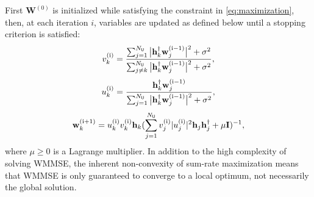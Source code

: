 First $\mathbf{W}^{(0)}$ is initialized while satisfying the constraint in \eqref{eq:maximization},
then, at each iteration $i$, variables are updated as defined below until a stopping criterion is satisfied:
\begin{align}
    v^{(\text{i})}_{k} = \frac{ \sum_{j =1}^{N_{\sf{U}}} \big|\mathbf{h}^{\dagger}_{k} \mathbf{w}^{(\text{i}-1)}_{j} \big|^2 + \sigma^2}{\sum_{j \neq k}^{N_{\sf{U}}} \big|\mathbf{h}^{\dagger}_{k} \mathbf{w}^{(\text{i}-1)}_{j} \big|^2 + \sigma^2},
\end{align}
\begin{align}
    u^{(\text{i})}_{k} = \frac{ \mathbf{h}^{\dagger}_{k} \mathbf{w}^{(\text{i}-1)}_{j} }{\sum_{j=1}^{N_{\sf{U}}} \big|\mathbf{h}^{\dagger}_{k} \mathbf{w}^{(\text{i}-1)}_{j} \big|^2 + \sigma^2},
\end{align}
\begin{align}\label{eq:construct_beamforming_matrix}
    \mathbf{w}^{(\text{i}+1)}_{k} =  u^{(\text{i})}_{k} v^{(\text{i})}_{k}\mathbf{h}_{k}(\sum^{N_{\sf{U}}}_{j=1}   v^{(\text{i})}_{j} |u^{(\text{i})}_{j}|^2 \mathbf{h}_{j}\mathbf{h}_{j}^{\dagger} + \mu \mathbf{I})^{-1},
\end{align}
where $\mu \geq 0$ is a Lagrange multiplier.
In addition to the high complexity of solving \gls{WMMSE}, the inherent non-convexity of sum-rate maximization means that WMMSE is only guaranteed to converge to a local optimum, not necessarily the global solution.